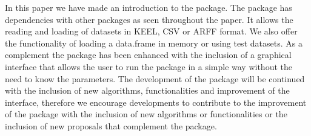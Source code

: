 In this paper we have made an introduction to the  package. The package has dependencies with other packages as seen throughout the paper. It allows the reading and loading of datasets in KEEL, CSV or ARFF format. We also offer the functionality of loading a data.frame in memory or using test datasets. As a complement the package has been enhanced with the inclusion of a graphical interface that allows the user to run the package in a simple way without the need to know the parameters. The development of the package will be continued with the inclusion of new algorithms, functionalities and improvement of the interface, therefore we encourage developments to contribute to the improvement of the package with the inclusion of new algorithms or functionalities or the inclusion of new proposals that complement the package.



\address{Luis Alfonso Pérez Martos\\
  Computer Department\\
  University of Jaén\\
  Spain\\
  (ORCiD if desired)\\
  }

\address{Ángel Miguel García Vico\\
  Computer Department\\
  University of Jaén\\
  Spain\\
  (ORCiD if desired)\\
  }

\address{Pedro González\\
  Computer Department\\
  University of Jaén\\
  Spain\\
  (ORCiD if desired)\\
  }

\address{Cristóbal J. Carmona\\
  Computer Department\\
  University of Jaén\\
  Spain\\
  (ORCiD if desired)\\
  }
